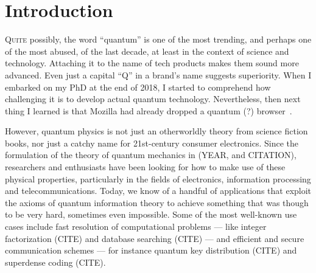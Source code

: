 \chapter{Introduction}
\label{chp:intro}

\begin{refsection}



\lettrine{Q}{uite} possibly, the word ``quantum'' is one of the most trending, and perhaps one of
the most abused, of the last decade, at least in the context of science and technology. Attaching it
to the name of tech products makes them sound more advanced. Even just a capital ``Q'' in a brand's
name suggests superiority. When I embarked on my PhD at the end of 2018, I started to comprehend how
challenging it is to develop actual quantum technology. Nevertheless, then next thing I learned is
that Mozilla had already dropped a quantum (?) browser~\cite{firefox_quantum}.

However, quantum physics is not just an otherworldly theory from science fiction books, nor just a
catchy name for 21st-century consumer electronics. Since the formulation of the theory of quantum
mechanics in (YEAR, and CITATION), researchers and enthusiasts have been looking for how to make use
of these physical properties, particularly in the fields of electronics, information processing and
telecommunications. Today, we know of a handful of applications that exploit the axioms of quantum
information theory to achieve something that was though to be very hard, sometimes even impossible.
Some of the most well-known use cases include fast resolution of computational problems --- like
integer factorization (CITE) and database searching (CITE) --- and efficient and secure
communication schemes --- for instance quantum key distribution (CITE) and superdense coding (CITE).


\end{refsection}

